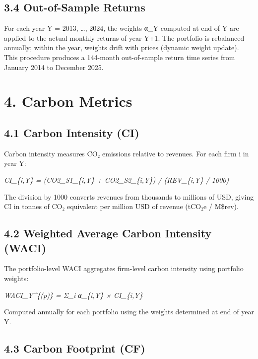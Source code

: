 \documentclass[
  11pt,
]{article}
\begin{document}
\hypertarget{out-of-sample-returns}{%
\subsection{3.4 Out-of-Sample Returns}\label{out-of-sample-returns}}

For each year Y = 2013, \ldots, 2024, the weights α\_Y computed at end
of Y are applied to the actual monthly returns of year Y+1. The
portfolio is rebalanced annually; within the year, weights drift with
prices (dynamic weight update). This procedure produces a 144-month
out-of-sample return time series from January 2014 to December 2025.

\hypertarget{carbon-metrics}{%
\section{4. Carbon Metrics}\label{carbon-metrics}}

\hypertarget{carbon-intensity-ci}{%
\subsection{4.1 Carbon Intensity (CI)}\label{carbon-intensity-ci}}

Carbon intensity measures CO₂ emissions relative to revenues. For each
firm i in year Y:

\emph{CI\_\{i,Y\} = (CO2\_S1\_\{i,Y\} + CO2\_S2\_\{i,Y\}) /
(REV\_\{i,Y\} / 1000)}

The division by 1000 converts revenues from thousands to millions of
USD, giving CI in tonnes of CO₂ equivalent per million USD of revenue
(tCO₂e / M\$rev).

\hypertarget{weighted-average-carbon-intensity-waci}{%
\subsection{4.2 Weighted Average Carbon Intensity
(WACI)}\label{weighted-average-carbon-intensity-waci}}

The portfolio-level WACI aggregates firm-level carbon intensity using
portfolio weights:

\emph{WACI\_Y\^{}\{(p)\} = Σ\_i α\_\{i,Y\} × CI\_\{i,Y\}}

Computed annually for each portfolio using the weights determined at end
of year Y.

\hypertarget{carbon-footprint-cf}{%
\subsection{4.3 Carbon Footprint (CF)}\label{carbon-footprint-cf}}
\end{document}
